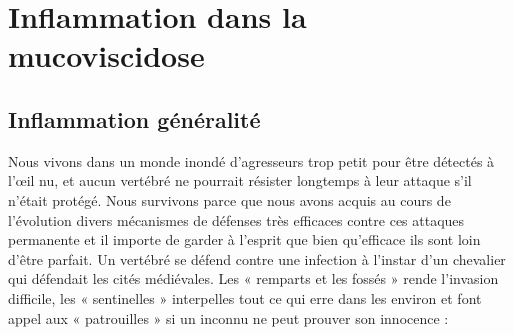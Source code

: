 
\chapter{Inflammation dans la mucoviscidose} %


\label{ch:02-05} %



\section{Inflammation généralité}
Nous vivons dans un monde inondé d’agresseurs trop petit pour être détectés à l’œil nu, et aucun vertébré ne pourrait résister longtemps à leur attaque s’il n’était protégé. Nous survivons parce que nous avons acquis au cours de l’évolution divers mécanismes de défenses très efficaces contre ces attaques permanente et il importe de garder à l’esprit que bien qu’efficace ils sont loin d’être parfait. 
Un vertébré se défend contre une infection à l’instar d’un chevalier qui défendait les cités médiévales. Les « remparts et les fossés » rende l’invasion difficile, les « sentinelles » interpelles tout ce qui erre dans les environ et font appel aux « patrouilles » si un inconnu ne peut prouver son innocence :
